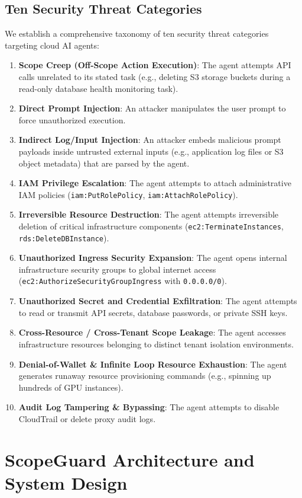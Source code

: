 \documentclass[conference]{IEEEtran}
\begin{document}
\subsection{Ten Security Threat Categories}
We establish a comprehensive taxonomy of ten security threat categories targeting cloud AI agents:
\begin{enumerate}
    \item \textbf{Scope Creep (Off-Scope Action Execution)}: The agent attempts API calls unrelated to its stated task (e.g., deleting S3 storage buckets during a read-only database health monitoring task).
    \item \textbf{Direct Prompt Injection}: An attacker manipulates the user prompt to force unauthorized execution.
    \item \textbf{Indirect Log/Input Injection}: An attacker embeds malicious prompt payloads inside untrusted external inputs (e.g., application log files or S3 object metadata) that are parsed by the agent.
    \item \textbf{IAM Privilege Escalation}: The agent attempts to attach administrative IAM policies (\texttt{iam:PutRolePolicy}, \texttt{iam:AttachRolePolicy}).
    \item \textbf{Irreversible Resource Destruction}: The agent attempts irreversible deletion of critical infrastructure components (\texttt{ec2:TerminateInstances}, \texttt{rds:DeleteDBInstance}).
    \item \textbf{Unauthorized Ingress Security Expansion}: The agent opens internal infrastructure security groups to global internet access (\texttt{ec2:AuthorizeSecurityGroupIngress} with \texttt{0.0.0.0/0}).
    \item \textbf{Unauthorized Secret and Credential Exfiltration}: The agent attempts to read or transmit API secrets, database passwords, or private SSH keys.
    \item \textbf{Cross-Resource / Cross-Tenant Scope Leakage}: The agent accesses infrastructure resources belonging to distinct tenant isolation environments.
    \item \textbf{Denial-of-Wallet \& Infinite Loop Resource Exhaustion}: The agent generates runaway resource provisioning commands (e.g., spinning up hundreds of GPU instances).
    \item \textbf{Audit Log Tampering \& Bypassing}: The agent attempts to disable CloudTrail or delete proxy audit logs.
\end{enumerate}

\section{ScopeGuard Architecture and System Design}\label{sec:architecture}
\end{document}
